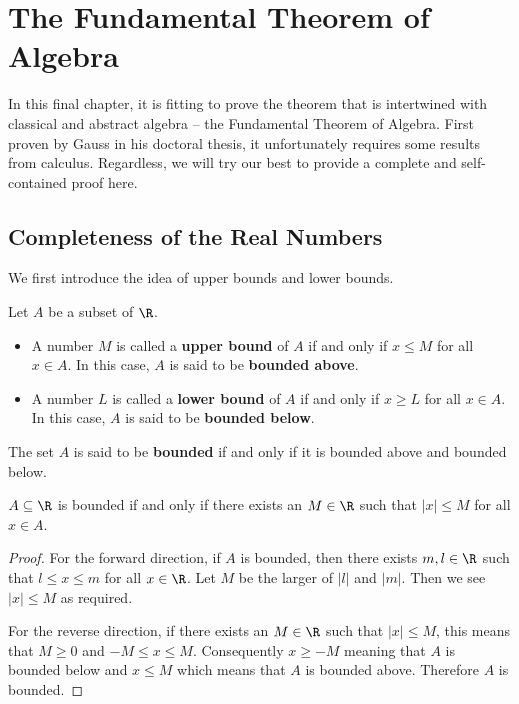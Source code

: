 \chapter{The Fundamental Theorem of Algebra}
In this final chapter, it is fitting to prove the theorem that is intertwined with classical and abstract algebra -- the Fundamental Theorem of Algebra. First proven by Gauss in his doctoral thesis, it unfortunately requires some results from calculus. Regardless, we will try our best to provide a complete and self-contained proof here.

\section{Completeness of the Real Numbers}
We first introduce the idea of upper bounds and lower bounds.

\begin{definition}
    Let $A$ be a subset of $\R$.
    \begin{itemize}
        \item A number $M$ is called a \textbf{upper bound} of $A$ if and only if $x \leq M$ for all $x \in A$. In this case, $A$ is said to be \textbf{bounded above}.
        \item A number $L$ is called a \textbf{lower bound} of $A$ if and only if $x \geq L$ for all $x \in A$. In this case, $A$ is said to be \textbf{bounded below}.
    \end{itemize}
    The set $A$ is said to be \textbf{bounded} if and only if it is bounded above and bounded below.
\end{definition}

\begin{proposition}
    $A \subseteq \R$ is bounded if and only if there exists an $M \in \R$ such that $|x| \leq M$ for all $x \in A$.
\end{proposition}
\begin{proof}
    For the forward direction, if $A$ is bounded, then there exists $m, l \in \R$ such that $l \leq x \leq m$ for all $x \in \R$. Let $M$ be the larger of $|l|$ and $|m|$. Then we see $|x| \leq M$ as required.

    For the reverse direction, if there exists an $M \in \R$ such that $|x| \leq M$, this means that $M \geq 0$ and $-M \leq x \leq M$. Consequently $x \geq -M$ meaning that $A$ is bounded below and $x \leq M$ which means that $A$ is bounded above. Therefore $A$ is bounded.
\end{proof}

